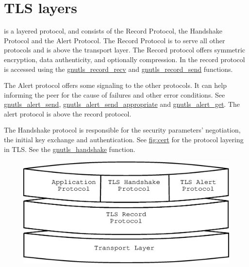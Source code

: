 \newpage
\section{TLS layers}

\tlsI{} is a layered protocol, and consists of the Record Protocol,
the Handshake Protocol and the Alert Protocol. The Record Protocol
is to serve all other protocols and is above the transport layer.
The Record protocol offers symmetric encryption, data authenticity, and
optionally compression.
In \gnutls{} the record protocol is accessed using the 
\hyperref{gnutls\_record\_recv()}{gnutls\_record\_recv() (see Section }{)}{gnutls_record_recv} and
\hyperref{gnutls\_record\_send()}{gnutls\_record\_send() (see Section }{)}{gnutls_record_send}
functions.

\par
The Alert protocol offers some signaling to the other protocols. It can
help informing the peer for the cause of failures and other error
conditions. See
\hyperref{gnutls\_alert\_send()}{gnutls\_alert\_send() (see Section }{)}{gnutls_alert_send},
\hyperref{gnutls\_alert\_send\_appropriate()}{gnutls\_alert\_send\_appropriate() (see Section }{)}{gnutls_alert_send_appropriate}
and
\hyperref{gnutls\_alert\_get()}{gnutls\_alert\_get() (see Section }{)}{gnutls_alert_get}.
The alert protocol is above the record protocol.

\par 
The Handshake protocol is responsible for the security parameters'
negotiation, the initial key exchange and
authentication. See \hyperref{figure}{figure }{}{fig:cert} for the
protocol layering in TLS. See the
\hyperref{gnutls\_handshake()}{gnutls\_handshake() (see Section }{)}{gnutls_handshake} function.

\begin{figure}[hbtp]
\includegraphics{layers}
\label{fig:layers}

\end{figure}


\addvspace{1.5cm}

